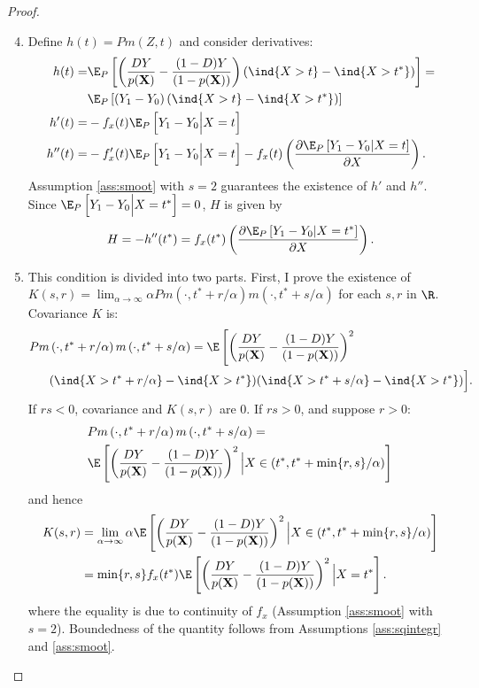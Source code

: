 {\begin{proof}
\begin{enumerate} \setcounter{enumi}{3}
    \item Define $h(t) = P m(Z, t)$ and consider derivatives:
    \begin{align}
         h(t) =& \E_P\left[\left(\frac{D Y}{p(\textbf{X})} - \frac{(1-D) Y}{(1-p(\textbf{X}))} \right) (\ind\{X > t\} - \ind\{X > t^*\}) \right] = \\
        & \E_P\left[\left(Y_1 - Y_0\right) (\ind\{X > t\} - \ind\{X > t^*\})\right] \\
        h'(t) =& - f_x(t)\E_P\left[Y_1 - Y_0 \Big| X = t \right] \\
        h''(t) =& - f'_x(t)\E_P\left[Y_1 - Y_0 \Big| X = t \right] - f_x(t) \left(\frac{\partial \E_P\left[Y_1 - Y_0 | X = t \right]}{\partial X} \right). 
    \end{align}
    Assumption \ref{ass:smoot} with $s=2$ guarantees the existence of $h'$ and $h''$. Since $\E_P\left[Y_1 - Y_0 \Big| X = t^* \right] = 0$, $H$ is given by
    \begin{gather}
        H= - h''(t^*) =  f_x(t^*) \left(\frac{\partial \E_P\left[Y_1 - Y_0 | X = t^* \right]}{\partial X} \right).
    \end{gather}
    \item This condition is divided into two parts. First, I prove the existence of $K(s, r)=\lim _{\alpha \rightarrow \infty} \alpha P m\left(\cdot, t^*+r / \alpha\right) m\left(\cdot, t^*+s / \alpha\right)$ for each $s,r$ in $\R$. Covariance $K$ is:
    \begin{align}
         P m & \left(\cdot, t^*+r / \alpha\right) m\left(\cdot, t^*+s / \alpha\right) =
         \E \left[ \left(\frac{DY}{p(\textbf{X})} - \frac{(1-D) Y}{(1-p(\textbf{X}))}\right)^2 \right. \\
        & (\ind\{X>t^*+r/ \alpha \} -\ind\{X>t^* \}) (\ind\{X>t^*+s/ \alpha \} -\ind\{X>t^* \})\Big].
    \end{align}
    If $rs<0$, covariance and $K(s,r)$ are 0. If $rs>0$, and suppose $r>0$:
    \begin{align}
         & P m\left(\cdot, t^*+r / \alpha\right) m\left(\cdot, t^*+s / \alpha\right) = \\
         & \E \left[ \left(\frac{DY}{p(\textbf{X})} - \frac{(1-D) Y}{(1-p(\textbf{X}))}\right)^2 \Big| X \in (t^*,t^* + \min\{r,s\}/\alpha )\right]
    \end{align}
    and hence
    \begin{align}
        K(s, r)&=\lim _{\alpha \rightarrow \infty} \alpha \E \left[ \left(\frac{DY}{p(\textbf{X})} - \frac{(1-D) Y}{(1-p(\textbf{X}))}\right)^2 \Big| X \in (t^*,t^* + \min\{r,s\}/\alpha )\right] \\
        &= \min\{r,s\} f_x(t^*) \E \left[ \left(\frac{DY}{p(\textbf{X})} - \frac{(1-D) Y}{(1-p(\textbf{X}))}\right)^2 \Big| X = t^*\right].
    \end{align}
    where the equality is due to continuity of $f_x$ (Assumption \ref{ass:smoot} with $s=2$). Boundedness of the quantity follows from Assumptions \ref{ass:sqintegr} and \ref{ass:smoot}.
    

\end{enumerate}
\end{proof}}
